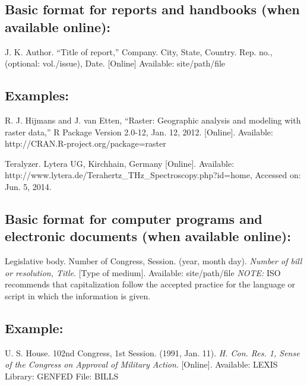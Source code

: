 \documentclass[journal]{IEEEtran}
\begin{document}
\subsection*{Basic format for reports  and  handbooks (when available online):}
  
J. K. Author. ``Title of report,'' Company. City, State, Country. Rep. no., (optional: vol./issue), Date. [Online] Available: site/path/file 

\subsection*{Examples:}

\begin{thebibliography}{34}
\setcounter{enumiv}{17}

\bibitem{}R. J. Hijmans and J. van Etten, ``Raster: Geographic analysis and modeling with raster data,'' R Package Version 2.0-12, Jan. 12, 2012. [Online]. Available: http://CRAN.R-project.org/package=raster 

\bibitem{}Teralyzer. Lytera UG, Kirchhain, Germany [Online]. Available: http://www.lytera.de/Terahertz\_THz\_Spectroscopy.php?id=home, Accessed on: Jun. 5, 2014.
\end{thebibliography}

\subsection*{Basic format for computer programs and electronic documents (when available online):}

Legislative body. Number of Congress, Session. (year, month day). {\em Number of bill or resolution, Title}. [Type of medium]. Available: site/path/file
{\em NOTE:} ISO recommends that capitalization follow the accepted practice for the language or script in which the information is given.

\subsection*{Example:}

\begin{thebibliography}{34}
\setcounter{enumiv}{19}

\bibitem{}U. S. House. 102nd Congress, 1st Session. (1991, Jan. 11). {\em H. Con. Res. 1, Sense of the Congress on Approval of Military Action}. [Online]. Available: LEXIS Library: GENFED File: BILLS 
\end{thebibliography}
\end{document}
